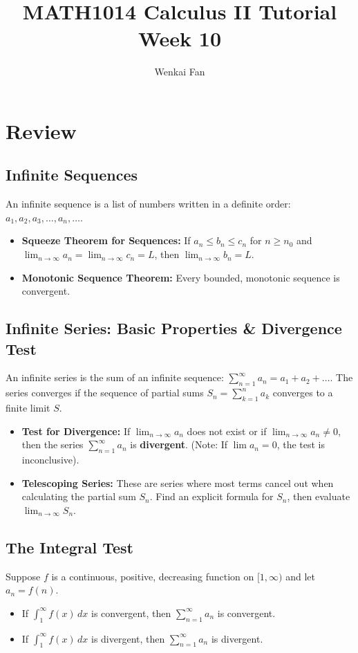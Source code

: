 \documentclass[11pt]{article}
\title{\vspace{-1.0em}MATH1014 Calculus II Tutorial\\Week 10}
\author{Wenkai Fan}
\date{}
\theoremstyle{definition}
\begin{document}
\maketitle
\thispagestyle{fancy}

\section{Review}

\subsection{Infinite Sequences}
An infinite sequence is a list of numbers written in a definite order: $a_1, a_2, a_3, \dots, a_n, \dots$. 
\begin{itemize}
    \item \textbf{Squeeze Theorem for Sequences:} If $a_n \le b_n \le c_n$ for $n \ge n_0$ and $\lim_{n \to \infty} a_n = \lim_{n \to \infty} c_n = L$, then $\lim_{n \to \infty} b_n = L$.
    \item \textbf{Monotonic Sequence Theorem:} Every bounded, monotonic sequence is convergent.
\end{itemize}

\subsection{Infinite Series: Basic Properties \& Divergence Test}
An infinite series is the sum of an infinite sequence: $\sum_{n=1}^\infty a_n = a_1 + a_2 + \dots$. 
The series converges if the sequence of partial sums $S_n = \sum_{k=1}^n a_k$ converges to a finite limit $S$.
\begin{itemize}
    \item \textbf{Test for Divergence:} If $\lim_{n \to \infty} a_n$ does not exist or if $\lim_{n \to \infty} a_n \neq 0$, then the series $\sum_{n=1}^\infty a_n$ is \textbf{divergent}. (Note: If $\lim a_n = 0$, the test is inconclusive).
    \item \textbf{Telescoping Series:} These are series where most terms cancel out when calculating the partial sum $S_n$. Find an explicit formula for $S_n$, then evaluate $\lim_{n \to \infty} S_n$.
\end{itemize}

\subsection{The Integral Test}
Suppose $f$ is a continuous, positive, decreasing function on $[1, \infty)$ and let $a_n = f(n)$.
\begin{itemize}
    \item If $\int_1^\infty f(x) \,dx$ is convergent, then $\sum_{n=1}^\infty a_n$ is convergent.
    \item If $\int_1^\infty f(x) \,dx$ is divergent, then $\sum_{n=1}^\infty a_n$ is divergent.
\end{itemize}
\end{document}
